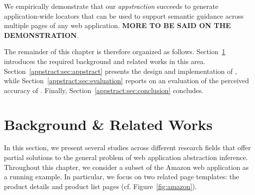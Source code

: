 We empirically demonstrate that our \emph{appstraction} succeeds to generate application-wide locators that can be used to support semantic guidance across multiple pages of any web application.
\textbf{MORE TO BE SAID ON THE DEMONSTRATION}.

The remainder of this chapter is therefore organized as follows.
Section~\ref{appstract:sec:related} introduces the required background and related works in this area.
Section~\ref{appstract:sec:appstract} presents the design and implementation of \textsc{\appstract{}}, while Section~\ref{appstract:sec:evaluation} reports on an evaluation of the perceived accuracy of \textsc{\appstract{}}.
Finally, Section~\ref{appstract:sec:conclusion} concludes.

\section{Background \& Related Works}\label{appstract:sec:related}
In this section, we present several studies across different research fields that offer partial solutions to the general problem of web application abstraction inference. 
Throughout this chapter, we consider a subset of the Amazon web application as a running example.
In particular, we focus on two related page templates: the product details and product list pages (cf. Figure~\ref{fig:amazon}).

